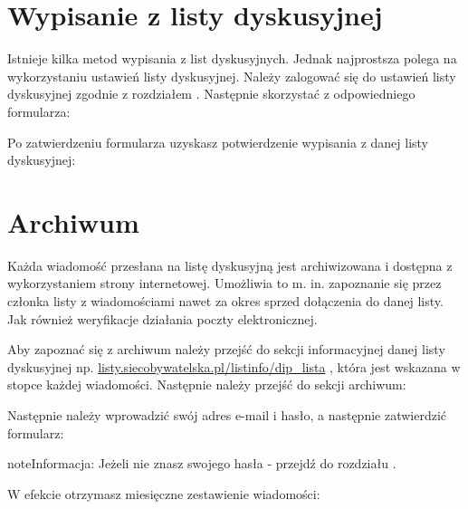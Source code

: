 \documentclass[letterpaper,10pt,polish]{sphinxmanual}
\begin{document}
\noindent{}


\section{Wypisanie z listy dyskusyjnej}
\label{users:wypisanie-z-listy-dyskusyjnej}
Istnieje kilka metod wypisania z list dyskusyjnych. Jednak najprostsza polega na wykorzystaniu ustawień listy dyskusyjnej. Należy zalogować się do ustawień listy dyskusyjnej zgodnie z rozdziałem {\hyperref[users:ustawienia]{}} . Następnie skorzystać z odpowiedniego formularza:

\noindent{}

Po zatwierdzeniu formularza uzyskasz potwierdzenie wypisania z danej listy dyskusyjnej:

\noindent{}


\section{Archiwum}
\label{users:archiwum}
Każda wiadomość przesłana na listę dyskusyjną jest archiwizowana i dostępna z wykorzystaniem strony internetowej. Umożliwia to m. in. zapoznanie się przez członka listy z wiadomościami nawet za okres sprzed dołączenia do danej listy. Jak również weryfikacje działania poczty elektronicznej.

Aby zapoznać się z archiwum należy przejść do sekcji informacyjnej danej listy dyskusyjnej np. \href{https://listy.siecobywatelska.pl/listinfo/dip\_lista}{listy.siecobywatelska.pl/listinfo/dip\_lista} , która jest wskazana w stopce każdej wiadomości. Następnie należy przejść do sekcji archiwum:

\noindent{}

Następnie należy wprowadzić swój adres e-mail i hasło, a następnie zatwierdzić formularz:

\noindent{}

\begin{notice}{note}{Informacja:}
Jeżeli nie znasz swojego hasła - przejdź do rozdziału {\hyperref[users:przypomnienie\string-hasla]{}}.
\end{notice}

W efekcie otrzymasz miesięczne zestawienie wiadomości:

\noindent{}



\renewcommand{\indexname}{Indeks}
\printindex
\end{document}
